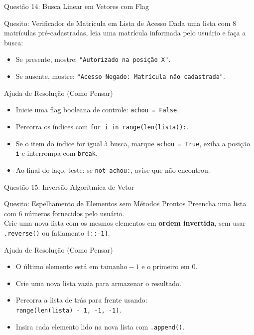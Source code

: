\begin{frame}{Questão 14: Busca Linear em Vetores com Flag}
    \begin{block}{Quesito: Verificador de Matrícula em Lista de Acesso}
        Dada uma lista com $8$ matrículas pré-cadastradas, leia uma matrícula informada pelo usuário e faça a busca:
        \begin{itemize}
            \item Se presente, mostre: \texttt{"Autorizado na posição X"}.
            \item Se ausente, mostre: \texttt{"Acesso Negado: Matrícula não cadastrada"}.
        \end{itemize}
    \end{block}

    \begin{exampleblock}{Ajuda de Resolução (Como Pensar)}
        \begin{itemize}
            \item Inicie uma flag booleana de controle: \texttt{achou = False}.
            \item Percorra os índices com \texttt{for i in range(len(lista)):}.
            \item Se o item do índice for igual à busca, marque \texttt{achou = True}, exiba a posição \texttt{i} e interrompa com \texttt{break}.
            \item Ao final do laço, teste: se \texttt{not achou:}, avise que não encontrou.
        \end{itemize}
    \end{exampleblock}
\end{frame}

\begin{frame}{Questão 15: Inversão Algorítmica de Vetor}
    \begin{block}{Quesito: Espelhamento de Elementos sem Métodos Prontos}
        Preencha uma lista com $6$ números fornecidos pelo usuário. \\
        Crie uma nova lista com os mesmos elementos em \textbf{ordem invertida}, sem usar \texttt{.reverse()} ou fatiamento \texttt{[::-1]}.
    \end{block}

    \begin{exampleblock}{Ajuda de Resolução (Como Pensar)}
        \begin{itemize}
            \item O último elemento está em $\text{tamanho} - 1$ e o primeiro em $0$.
            \item Crie uma nova lista vazia para armazenar o resultado.
            \item Percorra a lista de trás para frente usando: \\
            \texttt{range(len(lista) - 1, -1, -1)}.
            \item Insira cada elemento lido na nova lista com \texttt{.append()}.
        \end{itemize}
    \end{exampleblock}
\end{frame}
